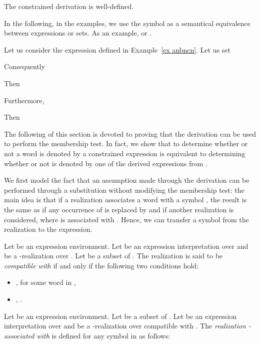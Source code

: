 \documentclass[a4paper]{llncs}
\begin{document}
  \begin{corollary}
    The constrained derivation is well-defined.
  \end{corollary} 
  In the following, in the examples, we use the symbol  as a semantical equivalence between expressions or sets. As an example,  or .
  \begin{example}\label{ex deriv anbncn}
    Let us consider the expression  defined in Example~\ref{ex anbncn}.
    Let us set 
    
    Consequently
    
    Then
    
    Furthermore,
    
    Then
    
  \end{example}
  
  The following of this section is devoted to proving that the derivation can be used to perform the membership test. In fact, we show that to determine whether or not a word  is denoted by a constrained expression  is equivalent to determining whether or not  is denoted by one of the derived expressions from .
  
  We first model the fact that an assumption made through the derivation can be performed through a substitution without modifying the membership test: the main idea is that if a realization associates a word  with a symbol , the result is the same as if any occurrence of  is replaced by  and if another realization is considered, where  is associated with . Hence, we can transfer a symbol from the realization to the expression.
  
  \begin{definition}
    Let  be an expression environment. Let  be an expression interpretation over  and  be a -realization over . Let  be a subset of . The realization  is said to be \emph{compatible with}  if and only if the following  two conditions hold:
    \begin{itemize}
      \item ,  for some word  in ,
      \item , .
    \end{itemize}
  \end{definition}
  
  \begin{definition}
    Let  be an expression environment. Let  be a subset of . Let  be an expression interpretation over  and  be a -realization over  compatible with .  The \emph{realization} \emph{-associated with}  is defined for any symbol  in  as follows:
    
  \end{definition}
  
\end{document}
